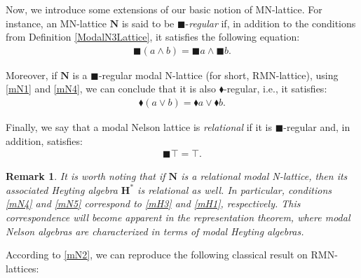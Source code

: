 \documentclass[pdflatex,sn-mathphys-num]{sn-jnl}%
\newcommand{\A}{\mathbf{A}}
\newcommand{\He}{\mathbf{H}}
\theoremstyle{thmstyleone}%
\theoremstyle{thmstyletwo}%
\newtheorem{remark}{Remark}%
\theoremstyle{thmstylethree}%
\begin{document}
 Now, we introduce some extensions of our basic notion of MN-lattice. For instance, an MN-lattice $\mathbf{N}$ is said to be $\blacksquare$-\emph{regular} if, in addition to the conditions from Definition \ref{ModalN3Lattice}, it satisfies the following equation:
 \begin{align}
     \blacksquare(a \wedge b) = \blacksquare a \wedge \blacksquare b. \tag{mN4}\label{mN4}
 \end{align}

 Moreover, if $\mathbf{N}$ is a $\blacksquare$-regular modal N-lattice (for short, RMN-lattice), using \eqref{mN1} and \eqref{mN4}, we can conclude that it is also $\blacklozenge$-regular, i.e., it satisfies:
 \begin{align}
     \blacklozenge(a \vee b) = \blacklozenge a \vee \blacklozenge b. \tag{mN4'} \label{mN4'}
 \end{align}

 Finally, we say that a modal Nelson lattice is \emph{relational} if it is $\blacksquare$-regular and, in addition, satisfies:
 \begin{align}
      \blacksquare \top = \top. \tag{mN5}\label{mN5}
 \end{align}

\begin{remark}
    It is worth noting that if $\mathbf{N}$ is a relational modal N-lattice, then its associated Heyting algebra $\He^*$ is relational as well. In particular, conditions \eqref{mN4} and \eqref{mN5} correspond to \eqref{mH3} and \eqref{mH1}, respectively. This correspondence will become apparent in the representation theorem, where modal Nelson algebras are characterized in terms of modal Heyting algebras.
\end{remark}


 According to \eqref{mN2}, we can reproduce the following classical result on RMN-lattices:
\end{document}
